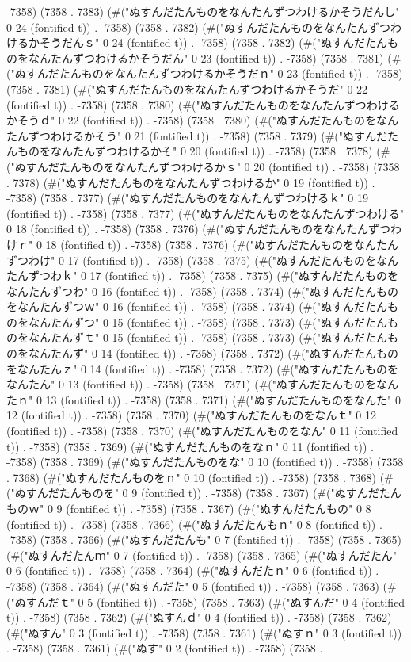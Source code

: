 -7358) (7358 . 7383) (#("ぬすんだたんものをなんたんずつわけるかそうだんし" 0 24 (fontified t)) . -7358) (7358 . 7382) (#("ぬすんだたんものをなんたんずつわけるかそうだんｓ" 0 24 (fontified t)) . -7358) (7358 . 7382) (#("ぬすんだたんものをなんたんずつわけるかそうだん" 0 23 (fontified t)) . -7358) (7358 . 7381) (#("ぬすんだたんものをなんたんずつわけるかそうだｎ" 0 23 (fontified t)) . -7358) (7358 . 7381) (#("ぬすんだたんものをなんたんずつわけるかそうだ" 0 22 (fontified t)) . -7358) (7358 . 7380) (#("ぬすんだたんものをなんたんずつわけるかそうｄ" 0 22 (fontified t)) . -7358) (7358 . 7380) (#("ぬすんだたんものをなんたんずつわけるかそう" 0 21 (fontified t)) . -7358) (7358 . 7379) (#("ぬすんだたんものをなんたんずつわけるかそ" 0 20 (fontified t)) . -7358) (7358 . 7378) (#("ぬすんだたんものをなんたんずつわけるかｓ" 0 20 (fontified t)) . -7358) (7358 . 7378) (#("ぬすんだたんものをなんたんずつわけるか" 0 19 (fontified t)) . -7358) (7358 . 7377) (#("ぬすんだたんものをなんたんずつわけるｋ" 0 19 (fontified t)) . -7358) (7358 . 7377) (#("ぬすんだたんものをなんたんずつわける" 0 18 (fontified t)) . -7358) (7358 . 7376) (#("ぬすんだたんものをなんたんずつわけｒ" 0 18 (fontified t)) . -7358) (7358 . 7376) (#("ぬすんだたんものをなんたんずつわけ" 0 17 (fontified t)) . -7358) (7358 . 7375) (#("ぬすんだたんものをなんたんずつわｋ" 0 17 (fontified t)) . -7358) (7358 . 7375) (#("ぬすんだたんものをなんたんずつわ" 0 16 (fontified t)) . -7358) (7358 . 7374) (#("ぬすんだたんものをなんたんずつｗ" 0 16 (fontified t)) . -7358) (7358 . 7374) (#("ぬすんだたんものをなんたんずつ" 0 15 (fontified t)) . -7358) (7358 . 7373) (#("ぬすんだたんものをなんたんずｔ" 0 15 (fontified t)) . -7358) (7358 . 7373) (#("ぬすんだたんものをなんたんず" 0 14 (fontified t)) . -7358) (7358 . 7372) (#("ぬすんだたんものをなんたんｚ" 0 14 (fontified t)) . -7358) (7358 . 7372) (#("ぬすんだたんものをなんたん" 0 13 (fontified t)) . -7358) (7358 . 7371) (#("ぬすんだたんものをなんたｎ" 0 13 (fontified t)) . -7358) (7358 . 7371) (#("ぬすんだたんものをなんた" 0 12 (fontified t)) . -7358) (7358 . 7370) (#("ぬすんだたんものをなんｔ" 0 12 (fontified t)) . -7358) (7358 . 7370) (#("ぬすんだたんものをなん" 0 11 (fontified t)) . -7358) (7358 . 7369) (#("ぬすんだたんものをなｎ" 0 11 (fontified t)) . -7358) (7358 . 7369) (#("ぬすんだたんものをな" 0 10 (fontified t)) . -7358) (7358 . 7368) (#("ぬすんだたんものをｎ" 0 10 (fontified t)) . -7358) (7358 . 7368) (#("ぬすんだたんものを" 0 9 (fontified t)) . -7358) (7358 . 7367) (#("ぬすんだたんものｗ" 0 9 (fontified t)) . -7358) (7358 . 7367) (#("ぬすんだたんもの" 0 8 (fontified t)) . -7358) (7358 . 7366) (#("ぬすんだたんもｎ" 0 8 (fontified t)) . -7358) (7358 . 7366) (#("ぬすんだたんも" 0 7 (fontified t)) . -7358) (7358 . 7365) (#("ぬすんだたんｍ" 0 7 (fontified t)) . -7358) (7358 . 7365) (#("ぬすんだたん" 0 6 (fontified t)) . -7358) (7358 . 7364) (#("ぬすんだたｎ" 0 6 (fontified t)) . -7358) (7358 . 7364) (#("ぬすんだた" 0 5 (fontified t)) . -7358) (7358 . 7363) (#("ぬすんだｔ" 0 5 (fontified t)) . -7358) (7358 . 7363) (#("ぬすんだ" 0 4 (fontified t)) . -7358) (7358 . 7362) (#("ぬすんｄ" 0 4 (fontified t)) . -7358) (7358 . 7362) (#("ぬすん" 0 3 (fontified t)) . -7358) (7358 . 7361) (#("ぬすｎ" 0 3 (fontified t)) . -7358) (7358 . 7361) (#("ぬす" 0 2 (fontified t)) . -7358) (7358 . 